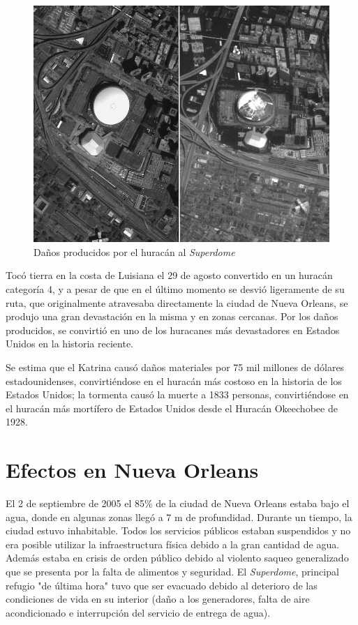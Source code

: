 \begin{figure}[H]
 \centering
 \includegraphics[width=120mm]{figuras/cap0/before_after.png}
 \caption{Daños producidos por el huracán al {\em Superdome}}
\end{figure}

Tocó tierra en la costa de Luisiana el 29 de agosto convertido en un huracán
categoría 4\cite{DeLozier}, y a pesar de que en el último momento se desvió
ligeramente de su ruta, que originalmente atravesaba directamente la ciudad de
Nueva Orleans, se produjo una gran devastación en la misma y en zonas cercanas.
Por los daños producidos, se convirtió en uno de los huracanes más devastadores
en Estados Unidos en la historia reciente.

Se estima que el Katrina causó daños materiales por 75 mil millones de dólares
estadounidenses, convirtiéndose en el huracán más costoso en la historia de los
Estados Unidos; la tormenta causó la muerte a 1833 personas, convirtiéndose en
el huracán más mortífero de Estados Unidos desde el Huracán Okeechobee de
1928\cite{Knabb05}.

\section{Efectos en Nueva Orleans}

El 2 de septiembre de 2005 el 85\% de la ciudad de Nueva Orleans estaba bajo el
agua, donde en algunas zonas llegó a 7 m de profundidad. Durante un tiempo, la
ciudad estuvo inhabitable. Todos los servicios públicos estaban suspendidos y no
era posible utilizar la infraestructura física debido a la gran cantidad de
agua. Además estaba en crisis de orden público debido al violento saqueo
generalizado que se presenta por la falta de alimentos y seguridad. El
{\em Superdome}, principal refugio "de última hora" tuvo que ser evacuado
debido al deterioro de las condiciones de vida en su interior (daño a los
generadores, falta de aire acondicionado e interrupción del servicio de
entrega de agua).

